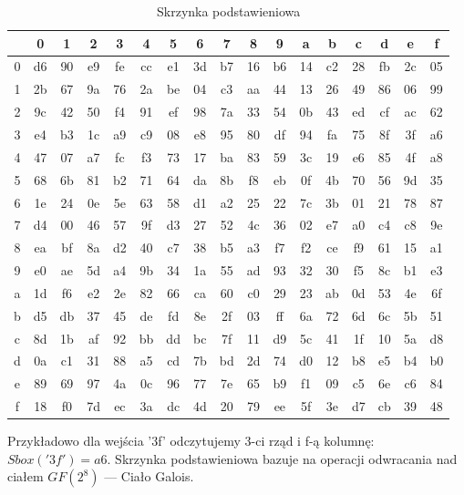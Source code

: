 \begin{table}[h!]
\centering
\caption{Skrzynka podstawieniowa}
\label{table:sbox}
\begin{tabular}{ | c | cccccccccccccccc | } 
\hline
 & 0 & 1 & 2 & 3 & 4 & 5 & 6 & 7 & 8 & 9 & a & b & c & d & e & f \\
\hline
0 & d6 & 90 & e9 & fe & cc & e1 & 3d & b7 & 16 & b6 & 14 & c2 & 28 & fb & 2c & 05 \\
1 & 2b & 67 & 9a & 76 & 2a & be & 04 & c3 & aa & 44 & 13 & 26 & 49 & 86 & 06 & 99 \\
2 & 9c & 42 & 50 & f4 & 91 & ef & 98 & 7a & 33 & 54 & 0b & 43 & ed & cf & ac & 62 \\
3 & e4 & b3 & 1c & a9 & c9 & 08 & e8 & 95 & 80 & df & 94 & fa & 75 & 8f & 3f & a6 \\
4 & 47 & 07 & a7 & fc & f3 & 73 & 17 & ba & 83 & 59 & 3c & 19 & e6 & 85 & 4f & a8 \\
5 & 68 & 6b & 81 & b2 & 71 & 64 & da & 8b & f8 & eb & 0f & 4b & 70 & 56 & 9d & 35 \\
6 & 1e & 24 & 0e & 5e & 63 & 58 & d1 & a2 & 25 & 22 & 7c & 3b & 01 & 21 & 78 & 87 \\
7 & d4 & 00 & 46 & 57 & 9f & d3 & 27 & 52 & 4c & 36 & 02 & e7 & a0 & c4 & c8 & 9e \\
8 & ea & bf & 8a & d2 & 40 & c7 & 38 & b5 & a3 & f7 & f2 & ce & f9 & 61 & 15 & a1 \\
9 & e0 & ae & 5d & a4 & 9b & 34 & 1a & 55 & ad & 93 & 32 & 30 & f5 & 8c & b1 & e3 \\
a & 1d & f6 & e2 & 2e & 82 & 66 & ca & 60 & c0 & 29 & 23 & ab & 0d & 53 & 4e & 6f \\
b & d5 & db & 37 & 45 & de & fd & 8e & 2f & 03 & ff & 6a & 72 & 6d & 6c & 5b & 51 \\
c & 8d & 1b & af & 92 & bb & dd & bc & 7f & 11 & d9 & 5c & 41 & 1f & 10 & 5a & d8 \\
d & 0a & c1 & 31 & 88 & a5 & cd & 7b & bd & 2d & 74 & d0 & 12 & b8 & e5 & b4 & b0 \\
e & 89 & 69 & 97 & 4a & 0c & 96 & 77 & 7e & 65 & b9 & f1 & 09 & c5 & 6e & c6 & 84 \\
f & 18 & f0 & 7d & ec & 3a & dc & 4d & 20 & 79 & ee & 5f & 3e & d7 & cb & 39 & 48 \\
\hline
\end{tabular}
\end{table}

Przykładowo dla wejścia '3f' odczytujemy 3-ci rząd i f-ą kolumnę: $Sbox('3f') = a6$. Skrzynka podstawieniowa bazuje na operacji odwracania nad ciałem $GF(2^8)$ --- Ciało Galois.

